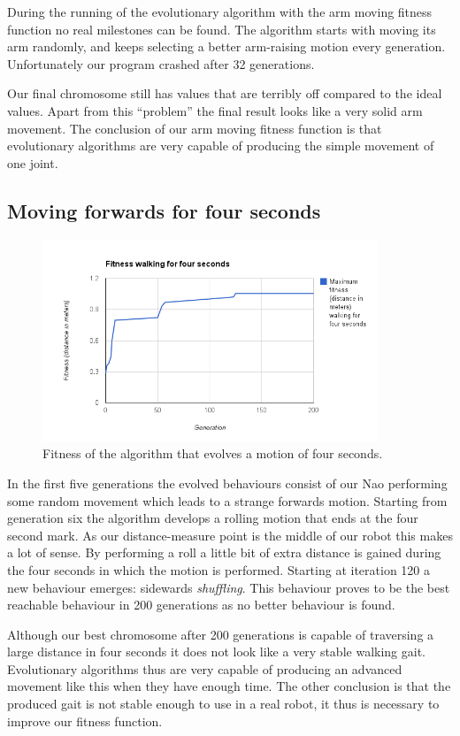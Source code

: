 \documentclass[a4paper,10pt]{article}
\begin{document}
During the running of the evolutionary algorithm with the arm moving fitness function no real milestones can be found. The algorithm starts with moving its arm randomly, and keeps selecting a better arm-raising motion every generation. Unfortunately our program crashed after 32 generations. 

Our final chromosome still has values that are terribly off compared to the ideal values. Apart from this “problem” the final result looks like a very solid arm movement. The conclusion of our arm moving fitness function is that evolutionary algorithms are very capable of producing the simple movement of one joint.

\subsection{Moving forwards for four seconds}
\label{sec:resultsJGapForwardsMoving}
\begin{figure}[h!]
\includegraphics[width=100mm]{images/walking}
\caption{Fitness of the algorithm that evolves a motion of four seconds.}
\label{fig:walkingFitness}
\end{figure}


In the first five generations the evolved behaviours consist of our Nao performing some random movement which leads to a strange forwards motion. Starting from generation six the algorithm develops a rolling motion that ends at the four second mark. As our distance-measure point is the middle of our robot this makes a lot of sense. By performing a roll a little bit of extra distance is gained during the four seconds in which the motion is performed. Starting at iteration 120 a new behaviour emerges: sidewards \emph{shuffling}. This behaviour proves to be the best reachable behaviour in 200 generations as no better behaviour is found. 

Although our best chromosome after 200 generations is capable of traversing a large distance in four seconds it does not look like a very stable walking gait. Evolutionary algorithms thus are very capable of producing an advanced movement like this when they have enough time. The other conclusion is that the produced gait is not stable enough to use in a real robot, it thus is necessary to improve our fitness function. 
\end{document}
